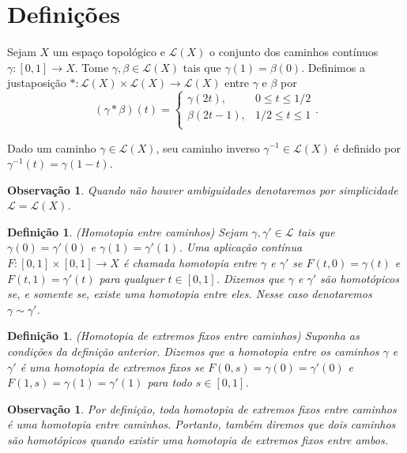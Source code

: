 \documentclass[12pt]{book}
\newtheorem{definicao}[teorema]{Definição}
\newtheorem{observacao}[teorema]{Observação}
\newcommand{\caminhos}{\mathcal{L}}
\newcommand{\caminhossempontobase}[1]{\caminhos(#1)}
\newcommand{\funcaocond}[5]{
	#1 = 
	\left\{
	\begin{array}{cc}
		#2, & #3\\
		#4, & #5\\
	\end{array}
	\right.
}
\newcommand{\intervalo}{[0,1]}
\begin{document}
	\section{Definições}
	
	Sejam $X$ um espaço topológico e $\caminhossempontobase{X}$ o conjunto dos caminhos contínuos $\gamma:[0,1]\to X$. Tome $\gamma, \beta \in \caminhossempontobase{X}$ tais que $\gamma(1) = \beta(0)$. Definimos a justaposição $*:\caminhossempontobase{X}\times \caminhossempontobase{X} \to \caminhossempontobase{X}$ entre $\gamma$ e $\beta$ por
	$$
	\funcaocond{(\gamma*\beta)(t)}{\gamma(2t)}{0\leq t \leq 1/2}{\beta(2t-1)}{1/2 \leq t \leq 1}.
	$$
	
	Dado um caminho $\gamma\in \caminhossempontobase{X}$, seu caminho inverso $\gamma^{-1} \in \caminhossempontobase{X}$ é definido por $\gamma^{-1}(t) = \gamma(1-t)$.
	
	\begin{observacao}
		Quando não houver ambiguidades denotaremos por simplicidade $\caminhos=\caminhossempontobase{X}$.
	\end{observacao}
	
	\begin{definicao}\label{definicao_caminhos_homotopicos}
		(Homotopia entre caminhos) Sejam $\gamma, \gamma' \in \caminhos$ tais que $\gamma(0)=\gamma'(0)$ e $\gamma(1)=\gamma'(1)$. Uma aplicação contínua $F:\intervalo \times \intervalo \to X$ é chamada homotopia entre $\gamma$ e $\gamma'$ se $F(t, 0) = \gamma(t)$ e $F(t, 1) = \gamma'(t)$ para qualquer $t\in \intervalo$. Dizemos que  $\gamma$ e $\gamma'$ são homotópicos se, e somente se, existe uma homotopia entre eles. Nesse caso denotaremos $\gamma \sim \gamma'$. 
	\end{definicao}
	
	\begin{definicao}\label{definicao_homotopia_extremos_fixos}
		(Homotopia de extremos fixos entre caminhos) Suponha as condições da definição anterior. Dizemos que a homotopia entre os caminhos $\gamma$ e $\gamma'$ é uma homotopia de extremos fixos se $F(0,s) = \gamma(0) = \gamma'(0)$ e $F(1,s) = \gamma(1) = \gamma'(1)$ para todo $s\in \intervalo$.
	\end{definicao}
	
	\begin{observacao}
		Por definição, toda homotopia de extremos fixos entre caminhos é uma homotopia entre caminhos. Portanto, também diremos que dois caminhos são homotópicos quando existir uma homotopia de extremos fixos entre ambos.
	\end{observacao}
	
\end{document}
